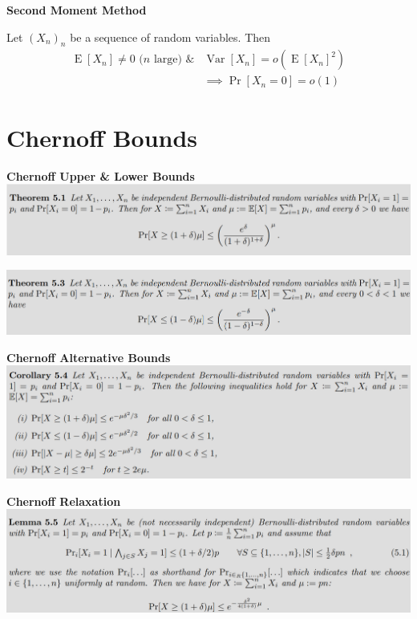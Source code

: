 \documentclass[25pt]{sciposter}
\newcommand{\Var}{\operatorname{Var}}
\newcommand{\E}{\operatorname{E}}
\newenvironment{method}[1]{\begin{mdframed}[backgroundcolor=blue!10,innertopmargin=15pt, innerbottommargin=15pt,nobreak=true]
		\textbf{#1 }
	}
	{ 
	\end{mdframed}
}
\begin{document}
\begin{multicols}{3}
	\begin{method}{Second Moment Method}
		Let $(X_n)_n$ be a sequence of random variables. Then 
		\begin{align}
\E[X_n] \neq 0 \text{ ($n$ large) \& }& \Var[X_n] = o(\E[X_n]^2) \\
&\implies \Pr[X_n = 0] = o(1)
		\end{align}
	\end{method}
		
		
		
		\section{Chernoff Bounds}
	
\textbf{Chernoff Upper \& Lower Bounds}\\
\includegraphics[width=\linewidth]{screenshot001}

\includegraphics[width=\linewidth]{screenshot002}

\textbf{Chernoff Alternative Bounds}\\
\includegraphics[width=\linewidth]{screenshot010}


\textbf{Chernoff Relaxation}\\
\includegraphics[width=\linewidth]{screenshot004}



\end{multicols}
\end{document}
